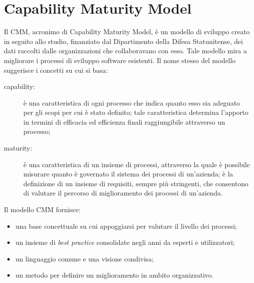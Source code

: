 \section{Capability Maturity Model}
Il CMM, acronimo di Capability Maturity Model, è un modello di sviluppo creato in seguito allo studio, finanziato dal  Dipartimento della Difesa Statunitense, dei dati raccolti dalle organizzazioni che collaboravano con esso. Tale modello mira a migliorare i processi di sviluppo software esistenti.
Il nome stesso del modello suggerisce i concetti su cui si basa:
\begin{description}
	\item[capability:] è una caratteristica di ogni processo che indica quanto esso sia adeguato per gli scopi per cui è stato definito; tale caratteristica determina l'apporto in termini di efficacia ed efficienza finali raggiungibile attraverso un processo;
	\item[maturity:] è una caratteristica di un insieme di processi, attraverso la quale è possibile misurare quanto è governato il sistema dei processi di un'azienda;
	\model[model:] è la definizione di un insieme di requisiti, sempre più stringenti, che consentono di valutare il percorso di miglioramento dei processi di un'azienda.
\end{description}
Il modello CMM fornisce:
\begin{itemize} 
	\item una base concettuale su cui appoggiarsi per valutare il livello dei processi;
	\item un insieme di \textit{best practice} consolidate negli anni da esperti e utilizzatori;
	\item un linguaggio comune e una visione condivisa;
	\item un metodo per definire un miglioramento in ambito organizzativo.
\end{itemize}
